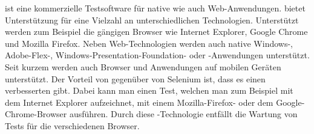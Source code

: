  \cite{SilkTest} ist eine kommerzielle Testsoftware für native wie auch Web-Anwendungen.  bietet Unterstützung für eine Vielzahl an unterschiedlichen Technologien. Unterstützt werden zum Beispiel die gängigen Browser wie Internet Explorer, Google Chrome und Mozilla Firefox. Neben Web-Technologien werden auch native Windows-, Adobe-Flex-, Windows-Presentation-Foundation- oder -Anwendungen unterstützt. Seit kurzem werden auch Browser und Anwendungen  auf mobilen Geräten unterstützt. Der Vorteil von  gegenüber von Selenium ist, dass es einen verbesserten  gibt. Dabei kann man einen Test, welchen man zum Beispiel mit dem Internet Explorer aufzeichnet, mit einem Mozilla-Firefox- oder dem Google-Chrome-Browser ausführen. Durch diese -Technologie entfällt die Wartung von Tests für die verschiedenen Browser. 
